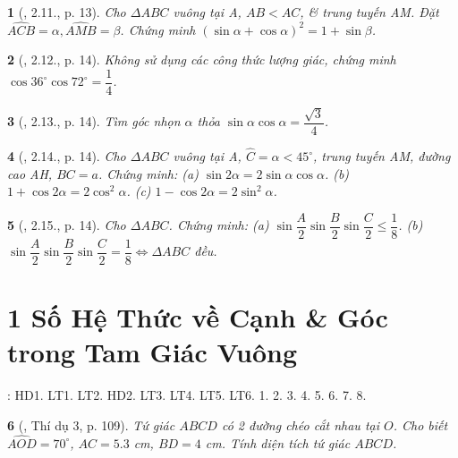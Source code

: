 \documentclass{article}
\newtheorem{baitoan}{}
\begin{document}
\begin{baitoan}[\cite{TLCT_THCS_Toan_9_hinh_hoc}, 2.11., p. 13]
	Cho $\Delta ABC$ vuông tại A, $AB < AC$, \& trung tuyến AM. Đặt $\widehat{ACB} = \alpha,\widehat{AMB} = \beta$. Chứng minh $(\sin\alpha + \cos\alpha)^2 = 1 + \sin\beta$.
\end{baitoan}

\begin{baitoan}[\cite{TLCT_THCS_Toan_9_hinh_hoc}, 2.12., p. 14]
	Không sử dụng các công thức lượng giác, chứng minh $\cos36^\circ\cos72^\circ = \dfrac{1}{4}$.
\end{baitoan}

\begin{baitoan}[\cite{TLCT_THCS_Toan_9_hinh_hoc}, 2.13., p. 14]
	Tìm góc nhọn $\alpha$ thỏa $\sin\alpha\cos\alpha = \dfrac{\sqrt{3}}{4}$.
\end{baitoan}

\begin{baitoan}[\cite{TLCT_THCS_Toan_9_hinh_hoc}, 2.14., p. 14]
	Cho $\Delta ABC$ vuông tại A, $\widehat{C} = \alpha < 45^\circ$, trung tuyến AM, đường cao AH, $BC = a$. Chứng minh: (a) $\sin2\alpha = 2\sin\alpha\cos\alpha$. (b) $1 + \cos2\alpha = 2\cos^2\alpha$. (c) $1 - \cos2\alpha = 2\sin^2\alpha$.
\end{baitoan}

\begin{baitoan}[\cite{TLCT_THCS_Toan_9_hinh_hoc}, 2.15., p. 14]
	Cho $\Delta ABC$. Chứng minh: (a) $\sin\dfrac{A}{2}\sin\dfrac{B}{2}\sin\dfrac{C}{2}\le\dfrac{1}{8}$. (b) $\sin\dfrac{A}{2}\sin\dfrac{B}{2}\sin\dfrac{C}{2} = \dfrac{1}{8}\Leftrightarrow\Delta ABC$ đều.
\end{baitoan}


\section{1 Số Hệ Thức về Cạnh \& Góc trong Tam Giác Vuông}
\cite[Chap. IV, \S2, pp. 82--87]{SGK_Toan_9_Canh_Dieu_tap_1}: HD1. LT1. LT2. HD2. LT3. LT4. LT5. LT6. 1. 2. 3. 4. 5. 6. 7. 8.

\begin{baitoan}[\cite{Tuyen_Toan_9_old}, Thí dụ 3, p. 109]
	Tứ giác $ABCD$ có 2 đường chéo cắt nhau tại $O$. Cho biết $\widehat{AOD} = 70^\circ$, $AC = 5.3$ \emph{cm}, $BD = 4$ \emph{cm}. Tính diện tích tứ giác $ABCD$.
\end{baitoan}
\end{document}
